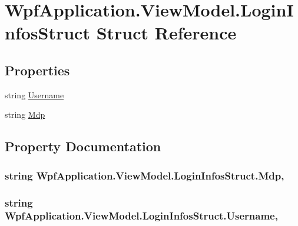 \hypertarget{struct_wpf_application_1_1_view_model_1_1_login_infos_struct}{\section{Wpf\-Application.\-View\-Model.\-Login\-Infos\-Struct Struct Reference}
\label{struct_wpf_application_1_1_view_model_1_1_login_infos_struct}
}
\subsection*{Properties}
\begin{DoxyCompactItemize}
\item 
string \hyperlink{struct_wpf_application_1_1_view_model_1_1_login_infos_struct_a2891a1643015a3c1c8d67690699c4fea}{Username}
\item 
string \hyperlink{struct_wpf_application_1_1_view_model_1_1_login_infos_struct_afa77847ff79f91b1bb2e8ae20b3431cb}{Mdp}
\end{DoxyCompactItemize}


\subsection{Property Documentation}
\hypertarget{struct_wpf_application_1_1_view_model_1_1_login_infos_struct_afa77847ff79f91b1bb2e8ae20b3431cb}{
\subsubsection[{Mdp}]{\setlength{\rightskip}{0pt plus 5cm}string Wpf\-Application.\-View\-Model.\-Login\-Infos\-Struct.\-Mdp\hspace{0.3cm}{\ttfamily [get]}, {\ttfamily [set]}}}\label{struct_wpf_application_1_1_view_model_1_1_login_infos_struct_afa77847ff79f91b1bb2e8ae20b3431cb}
\hypertarget{struct_wpf_application_1_1_view_model_1_1_login_infos_struct_a2891a1643015a3c1c8d67690699c4fea}{
\subsubsection[{Username}]{\setlength{\rightskip}{0pt plus 5cm}string Wpf\-Application.\-View\-Model.\-Login\-Infos\-Struct.\-Username\hspace{0.3cm}{\ttfamily [get]}, {\ttfamily [set]}}}\label{struct_wpf_application_1_1_view_model_1_1_login_infos_struct_a2891a1643015a3c1c8d67690699c4fea}


